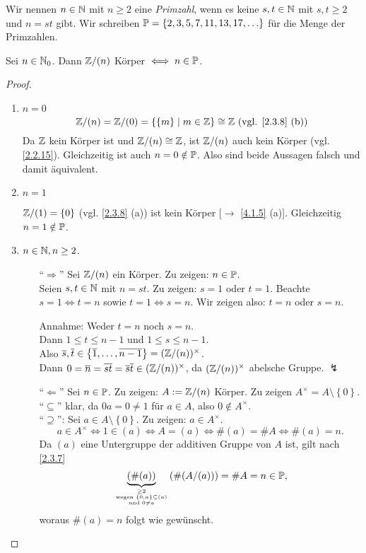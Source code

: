\documentclass[../../main.tex]{subfiles}
\begin{document}
\begin{df}\label{4.1.6}
Wir nennen $n\in \N$ mit $n\geq 2$ eine \emph{Primzahl}, wenn es keine $s,t\in \N$ mit $s,t\geq 2$ und $n=st$ gibt. Wir schreiben $\P=\left\{2,3,5,7,11,13,17,\ldots\right\}$ für die Menge der Primzahlen.
\end{df}

\begin{sat}\label{4.1.7}
Sei $n\in \N_0$. Dann $\Z/(n)$ Körper $\iff n\in\P$.
\end{sat}
\begin{proof}
\begin{enumerate}[{Fall} 1:]
\item $n=0$
$$\Z/(n)=\Z/(0)=\left\{\left\{m\right\}\mid m\in\Z\right\}\cong \Z ~\text{(vgl. \ref{2.3.8} (b))}$$
Da $\Z$ kein Körper ist und $\Z/(n)\cong \Z$, ist $\Z/(n)$ auch kein Körper (vgl. \ref{2.2.15}). Gleichzeitig ist auch $n= 0\notin\P$. Also sind beide Aussagen falsch und damit äquivalent.
\item $n=1$

\noindent
$\Z/(1)=\left\{0\right\}$ (vgl. \ref{2.3.8} (a)) ist kein Körper [$\to$ \ref{4.1.5} (a)]. Gleichzeitig $n=1\notin\P$.
\item $n\in\N,n\geq 2$.
\begin{itemize}
\item["`$\Longrightarrow$"'] Sei $\Z/(n)$ ein Körper. Zu zeigen: $n\in\P$.\\
Seien $s,t\in\N$ mit $n=st$. Zu zeigen: $s=1$ oder $t=1$. Beachte $s=1\iff t=n$ sowie $t=1\iff s=n$. Wir zeigen also:
$t=n$ oder $s=n$.

Annahme: Weder $t=n$ noch $s=n$.\\
Dann $1\leq t\leq n-1$ und $1\leq s\leq n-1$.\\
Also $\overline{s},\overline{t}\in\left\{\overline{1},\ldots,\overline{n-1}\right\}=(\Z/(n))^\times$.\\
Dann
$0=\overline{n}=\overline{st}=\overline{s}\overline{t}\in(\Z/(n))^\times$, da $(\Z/(n))^\times$ abelsche Gruppe. $\lightning$
\item["`$\Longleftarrow$"'] Sei $n\in\P$. Zu zeigen: $A:=\Z/(n)$ Körper. Zu zeigen $A^\times = A\setminus \left\{0\right\}$.\\
"`$\subseteq$"' klar, da $0a=0\neq 1$ für $a\in A$, also $0\notin A^\times$.\\
"`$\supseteq$"': Sei $a\in A\setminus \left\{0\right\}$. Zu zeigen: $a\in A^\times$.
$$a\in A^\times\iff 1\in (a)\iff A=(a)\iff \# (a)=\# A\iff\# (a) =n.$$
Da $(a)$ eine Untergruppe der additiven Gruppe von $A$ ist, gilt nach \ref{2.3.7}
\[
\underbrace{(\# (a))}_{\over{\geq 2}{\over{{\text{wegen }\left\{0,a\right\}\subseteq (a)}}{\text{und }0\neq a}}}(\# (A/(a)))=\# A=n\in\P,
\]
woraus $\# (a)=n$ folgt wie gewünscht.
\end{itemize}
\end{enumerate}
\end{proof}
\end{document}
